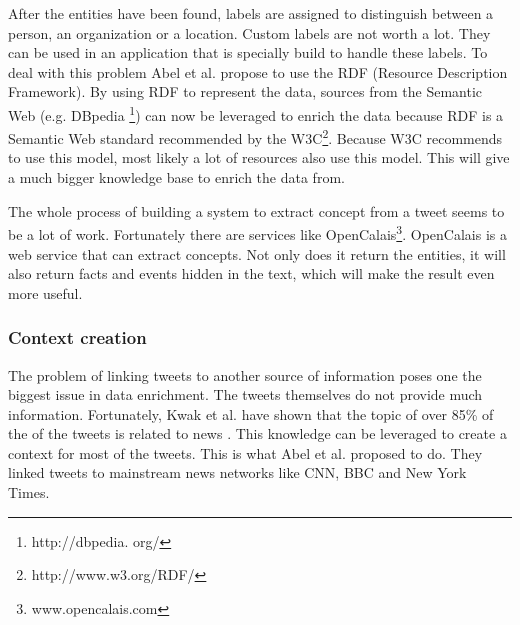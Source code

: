 \documentclass{article}
\begin{document}
After the entities have been found, labels are assigned to distinguish between a person, an organization or a location. Custom labels are not worth a lot. They can be used in an application that is specially build to handle these labels. To deal with this problem Abel et al. propose to use the RDF (Resource Description Framework).\cite{AdaptiveSearch} By using RDF to represent the data, sources from the Semantic Web (e.g. DBpedia \footnote{http://dbpedia.
org/}) can now be leveraged to enrich the data because RDF is a Semantic Web standard recommended by the W3C\footnote{http://www.w3.org/RDF/}. Because W3C recommends to use this model, most likely a lot of resources also use this model. This will give a much bigger knowledge base to enrich the data from.

The whole process of building a system to extract concept from a tweet seems to be a lot of work. Fortunately there are services like OpenCalais\footnote{www.opencalais.com}. OpenCalais is a web service that can extract concepts. Not only does it return the entities, it will also return facts and events hidden in the text, which will make the result even more useful.
\subsubsection{Context creation}
The problem of linking tweets to another source of information poses one the biggest issue in data enrichment. The tweets themselves do not provide much information. Fortunately, Kwak et al. have shown that the topic of over 85\% of the of the tweets is related to news \cite{newsmedia}. This knowledge can be leveraged to create a context for most of the tweets.  This is what Abel et al. proposed to do\cite{enrichmentForProfiling}. They linked tweets to mainstream news networks like CNN, BBC and New York Times.
\end{document}
